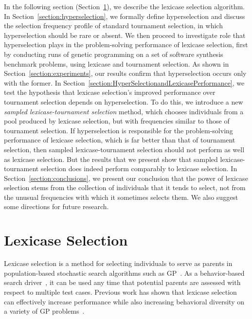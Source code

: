 \documentclass{sig-alternate}
\begin{document}
In the following section (Section~\ref{section:lexicase}), we  describe the lexicase selection algorithm. In Section~\ref{section:hyperselection}, we formally define hyperselection and discuss the selection frequency profile of standard tournament selection, in which hyperselection should be rare or absent. We then proceed to investigate role that hyperselection plays in the problem-solving performance of lexicase selection, first by conducting runs of genetic programming on a set of software synthesis benchmark problems, using lexicase and tournament selection. As shown in Section~\ref{section:experiments}, our results confirm that hyperselection occurs only with the former. In Section~\ref{section:HyperSelectionandLexicasePerformance}, we test the hypothesis that   lexicase selection's improved performance over tournament selection depends on hyperselection. To do this, we introduce a new \emph{sampled lexicase-tournament selection} method, which chooses individuals from a pool produced by lexicase selection, but with frequencies similar to those of tournament selection. If hyperselection is responsible for the problem-solving performance of lexicase selection, which is far better than that of tournament selection, then sampled lexicase-tournament selection should not perform as well as lexicase selection. But the results that we present show that sampled lexicase-tournament selection does indeed perform comparably to lexicase selection. In Section~\ref{section:conclusions}, we present our conclusion that the power of lexicase selection stems from the collection of individuals that it tends to select, not from the unusual frequencies with which it sometimes selects them. We also suggest some directions for future research.


\section{Lexicase Selection}
\label{section:lexicase}


Lexicase selection is a method for selecting individuals to serve as parents in population-based stochastic search algorithms such as GP~\cite{Helmuth:2014:ieeeTEC, Spector:2012:GECCOcompANEW}. As a behavior-based search driver~\cite{Krawiec:2015:GPTP}, %
it can be used any time that potential parents are assessed with respect to multiple test cases.
Previous work has shown that lexicase selection can effectively increase performance while also increasing behavioral diversity on a variety of GP problems~\cite{Helmuth:2015:GECCO, Helmuth:2014:ieeeTEC, Krawiec:2015:GECCO:smgpWorkshop, Helmuth:2015:GPTP}.
\end{document}
